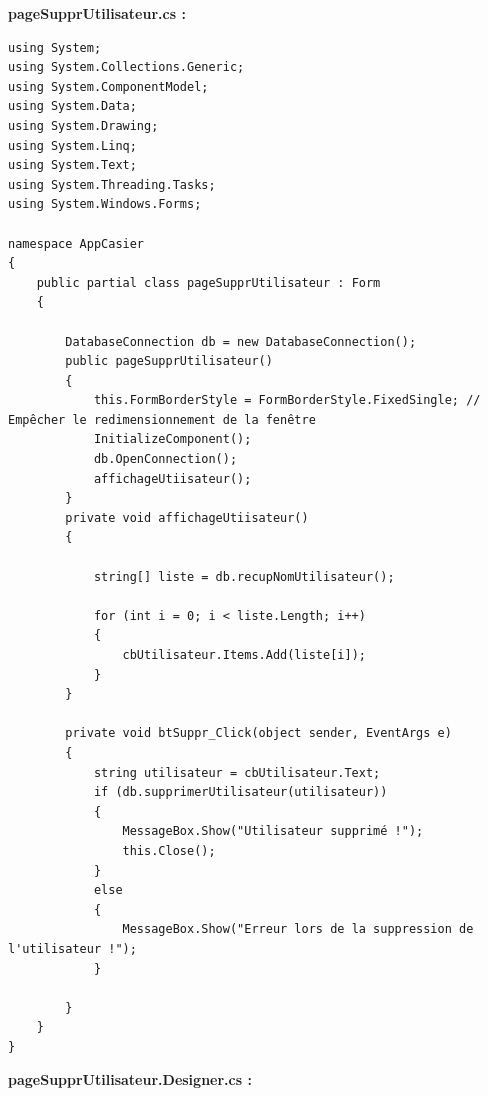 \documentclass[main.tex]{subfiles}
\begin{document}
\textbf{pageSupprUtilisateur.cs :}

\begin{lstlisting}
using System;
using System.Collections.Generic;
using System.ComponentModel;
using System.Data;
using System.Drawing;
using System.Linq;
using System.Text;
using System.Threading.Tasks;
using System.Windows.Forms;

namespace AppCasier
{
    public partial class pageSupprUtilisateur : Form
    {

        DatabaseConnection db = new DatabaseConnection();   
        public pageSupprUtilisateur()
        {
            this.FormBorderStyle = FormBorderStyle.FixedSingle; // Empêcher le redimensionnement de la fenêtre
            InitializeComponent();
            db.OpenConnection();
            affichageUtiisateur();
        }
        private void affichageUtiisateur()
        {

            string[] liste = db.recupNomUtilisateur();

            for (int i = 0; i < liste.Length; i++)
            {
                cbUtilisateur.Items.Add(liste[i]);
            }
        }

        private void btSuppr_Click(object sender, EventArgs e)
        {
            string utilisateur = cbUtilisateur.Text;
            if (db.supprimerUtilisateur(utilisateur))
            {
                MessageBox.Show("Utilisateur supprimé !");
                this.Close();
            }
            else
            {
                MessageBox.Show("Erreur lors de la suppression de l'utilisateur !");
            }

        }
    }
}
\end{lstlisting}

\textbf{pageSupprUtilisateur.Designer.cs :}
\end{document}
